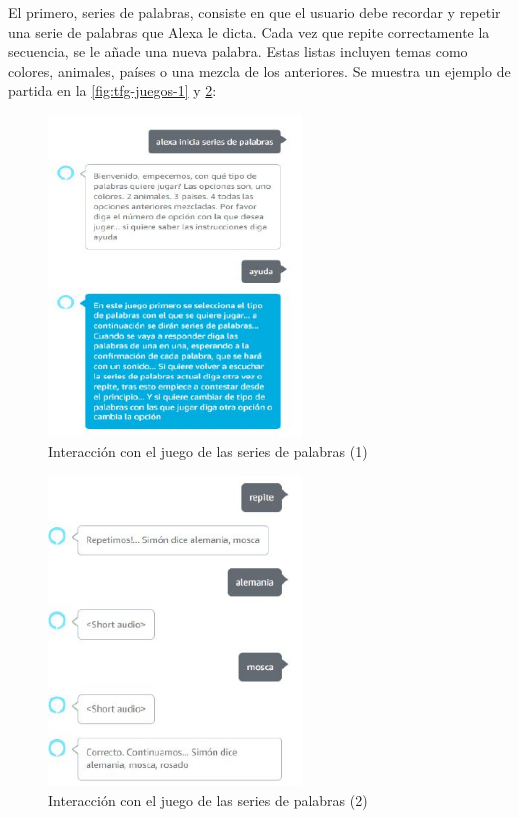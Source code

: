 El primero, series de palabras, consiste en que el usuario debe recordar y repetir una serie de palabras que Alexa le dicta. Cada vez que repite correctamente la secuencia, se le añade una nueva palabra. Estas listas incluyen temas como colores, animales, países o una mezcla de los anteriores. Se muestra un ejemplo de partida en la \autoref{fig:tfg-juegos-1} y \ref{fig:tfg-juegos-11}: 

\begin{figure}[H]
	\centering
	\includegraphics[width=0.6\textwidth]{imgs/tfg-juegos-1.JPG}
	\caption{Interacción con el juego de las series de palabras (1)}
	\label{fig:tfg-juegos-1}
\end{figure}

\begin{figure}[H]
	\centering
	\includegraphics[width=0.6\textwidth]{imgs/tfg-juegos-11.JPG}
	\caption{Interacción con el juego de las series de palabras (2)}
	\label{fig:tfg-juegos-11}
\end{figure}

